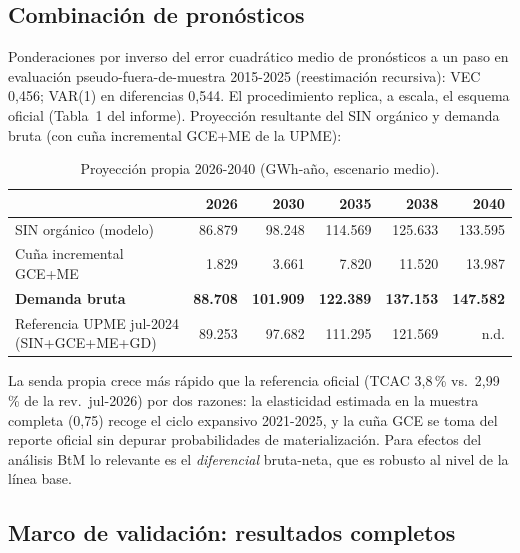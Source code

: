 \subsection{Combinación de pronósticos}

Ponderaciones por inverso del error cuadrático medio de pronósticos a un paso
en evaluación pseudo-fuera-de-muestra 2015-2025 (reestimación recursiva):
VEC 0,456; VAR(1) en diferencias 0,544. El procedimiento replica, a escala,
el esquema oficial (Tabla~1 del informe). Proyección resultante del SIN
orgánico y demanda bruta (con cuña incremental GCE+ME de la UPME):

\begin{table}[H]\centering\small
\caption{Proyección propia 2026-2040 (GWh-año, escenario medio).}
\begin{tabular}{lrrrrr}
\toprule
 & 2026 & 2030 & 2035 & 2038 & 2040\\
\midrule
SIN orgánico (modelo)        & 86.879 & 98.248 & 114.569 & 125.633 & 133.595\\
Cuña incremental GCE+ME      & 1.829  & 3.661  & 7.820   & 11.520  & 13.987\\
\textbf{Demanda bruta}       & \textbf{88.708} & \textbf{101.909} & \textbf{122.389} & \textbf{137.153} & \textbf{147.582}\\
Referencia UPME jul-2024 (SIN+GCE+ME+GD) & 89.253 & 97.682 & 111.295 & 121.569 & n.d.\\
\bottomrule
\end{tabular}
\end{table}

La senda propia crece más rápido que la referencia oficial (TCAC 3,8\,\% vs.\
2,99\,\% de la rev.\ jul-2026) por dos razones: la elasticidad estimada en la
muestra completa (0,75) recoge el ciclo expansivo 2021-2025, y la cuña GCE se
toma del reporte oficial sin depurar probabilidades de materialización. Para
efectos del análisis BtM lo relevante es el \emph{diferencial} bruta-neta,
que es robusto al nivel de la línea base.

\subsection{Marco de validación: resultados completos}

